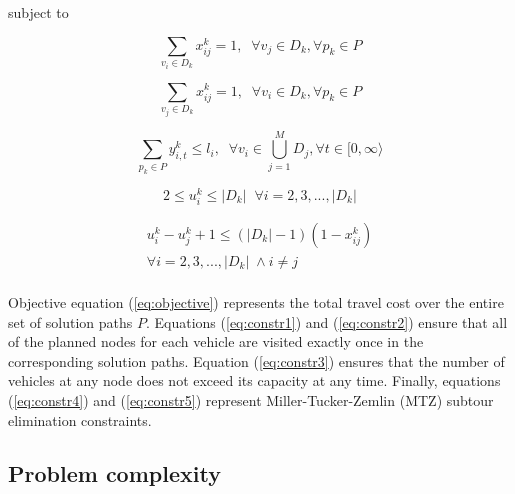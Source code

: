 \documentclass[conference]{IEEEtran}
\begin{document}
subject to



\begin{equation}
\label{eq:constr1}
\sum_{v_i\in D_k}x^k_{ij}=1, \; \;  \forall v_j \in D_k, \forall p_k \in P
\end{equation}

\begin{equation}
\label{eq:constr2}
\sum_{v_j\in D_k}x^k_{ij}=1, \; \;  \forall v_i \in D_k, \forall p_k \in P
\end{equation}

\begin{equation}
\label{eq:constr3}
\sum_{p_k \in P} y^k_{i,t} \le l_i, \; \; \forall v_i \in \bigcup\limits_{j=1}^{M} D_j, \forall t \in [0,\infty \rangle
\end{equation}

\begin{equation}
\label{eq:constr4}
{2\leq u^k_i \leq |D_k|\;\; \forall i= 2,3,...,|D_k|}
\end{equation}

\begin{equation}
\label{eq:constr5}
\begin{aligned}
 u^k_i - u^k_j +1 \leq (|D_k|-1)(1-x^k_{ij})\\ 
 \forall i= 2,3,...,|D_k|\; \wedge i\neq j \;\;\;\;\\
\end{aligned}
\end{equation}

Objective equation (\ref{eq:objective}) represents the total travel cost over the entire set of solution paths $ P $. Equations (\ref{eq:constr1}) and (\ref{eq:constr2}) ensure that all of the planned nodes for each vehicle are visited exactly once in the corresponding solution paths. Equation (\ref{eq:constr3}) ensures that the number of vehicles at any node does not exceed its capacity at any time. Finally, equations (\ref{eq:constr4}) and (\ref{eq:constr5}) represent Miller-Tucker-Zemlin (MTZ) subtour elimination constraints.

\subsection{Problem complexity}
\end{document}

